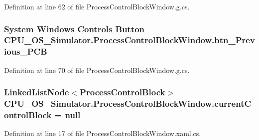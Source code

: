 Definition at line 62 of file Process\+Control\+Block\+Window.\+g.\+cs.

\hypertarget{class_c_p_u___o_s___simulator_1_1_process_control_block_window_af25ab71dad636514e08f3e8839b04727}{}
\subsubsection[{btn\+\_\+\+Previous\+\_\+\+P\+C\+B}]{\setlength{\rightskip}{0pt plus 5cm}System Windows Controls Button C\+P\+U\+\_\+\+O\+S\+\_\+\+Simulator.\+Process\+Control\+Block\+Window.\+btn\+\_\+\+Previous\+\_\+\+P\+C\+B\hspace{0.3cm}{\ttfamily [package]}}\label{class_c_p_u___o_s___simulator_1_1_process_control_block_window_af25ab71dad636514e08f3e8839b04727}


Definition at line 70 of file Process\+Control\+Block\+Window.\+g.\+cs.

\hypertarget{class_c_p_u___o_s___simulator_1_1_process_control_block_window_a6019633d26586b0df1c4c2d6f008f6c9}{}
\subsubsection[{current\+Control\+Block}]{\setlength{\rightskip}{0pt plus 5cm}Linked\+List\+Node$<${\bf Process\+Control\+Block}$>$ C\+P\+U\+\_\+\+O\+S\+\_\+\+Simulator.\+Process\+Control\+Block\+Window.\+current\+Control\+Block = {\bf null}\hspace{0.3cm}{\ttfamily [private]}}\label{class_c_p_u___o_s___simulator_1_1_process_control_block_window_a6019633d26586b0df1c4c2d6f008f6c9}


Definition at line 17 of file Process\+Control\+Block\+Window.\+xaml.\+cs.

